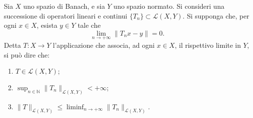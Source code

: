 \begin{corollary}
  Sia \(X\) uno spazio di Banach, e sia \(Y\) uno spazio normato. Si consideri una successione di operatori lineari e continui \(\{T_n\} \subset \mathcal L(X, Y)\). Si supponga che, per ogni \(x \in X\), esista \(y \in Y\) tale che 
  \[
    \lim_{n \to +\infty} \|T_n x - y\| = 0.
  \]
  Detta \(T : X \to Y\) l'applicazione che associa, ad ogni \(x \in X\), il rispettivo limite in \(Y\), si può dire che:
  \begin{enumerate}
    \item \(T \in \mathcal L(X, Y)\); 
    \item \(\sup_{n \in \mathbb N} \|T_n\|_{\mathcal L(X, Y)} < +\infty\);
    \item \(\|T\|_{\mathcal L(X, Y)} \le \liminf_{n \to +\infty} \|T_n\|_{\mathcal L(X, Y)}\). 
  \end{enumerate}
\end{corollary}


